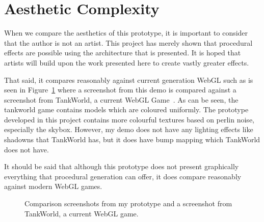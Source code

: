 
\section{Aesthetic Complexity}
When we compare the aesthetics of this prototype, it is important to consider that the author is not an artist.
This project has merely shown that procedural effects are possible using the architecture that is presented.
It is hoped that artists will build upon the work presented here to create vastly greater effects.

That said, it compares reasonably against current generation WebGL such as is seen in Figure~\ref{fig:minevstank} where a screenshot from this demo is compared against a screenshot from TankWorld, a current WebGL Game~\cite{web:tankworld}.
As can be seen, the tankworld game contains models which are coloured uniformly.
The prototype developed in this project contains more colourful textures based on perlin noise, especially the skybox.
However, my demo does not have any lighting effects like shadowns that TankWorld has, but it does have bump mapping which TankWorld does not have.

It should be said that although this prototype does not present graphically everything that procedural generation can offer, it does compare reasonably against modern WebGL games.

\begin{figure}
  \centering
  \caption{Comparison screenshots from my prototype and a screenshot from TankWorld, a current WebGL game.}
  \label{fig:minevstank}
\end{figure}

